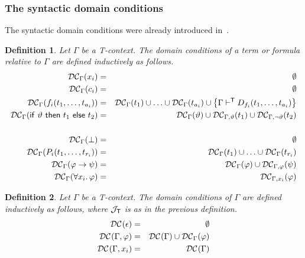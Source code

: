 \documentclass{article}
\newtheorem{definition}{Definition}[section]
\newcommand{\T}{\textsf T}
\newcommand{\ifthelse}[3]{\ensuremath{\mathsf{if}\ {#1}\ \mathsf{then}\ {#2}\ \mathsf{else}\ {#3}}}
\newcommand{\lang}[1]{\ensuremath{{\cal L}_{\mathsf{#1}}}}
\newcommand{\terms}[1]{\ensuremath{{\cal T}_{\mathsf{#1}}}}
\newcommand{\judg}[1]{\ensuremath{{\cal J}_{\mathsf{#1}}}}
\newcommand{\myvdash}[1]{\ensuremath{\vdash^{\mathsf{#1}}}}
\newcommand{\synDC}[1][{}]{\ifthenelse{\equal{#1}{}}{%
{\ensuremath{{\cal{DC}}}}}{%
{\ensuremath{{\cal{DC}}_{#1}}}}}
\def\sep{.\,}
\begin{document}
\subsubsection*{The syntactic domain conditions}

The syntactic domain conditions were already introduced
in~\cite{wie:zwa:03}.

\begin{definition}\label{defn:synDCGamma}
Let $\Gamma$ be a {\T}-context.  The domain conditions of a term or
formula relative to $\Gamma$ are defined inductively as follows.
\begin{eqnarray*}
\synDC[\Gamma](x_i) & = & \emptyset \\
\synDC[\Gamma](c_i) & = & \emptyset \\
\synDC[\Gamma](f_i(t_1,\ldots,t_{a_i})) & = &
 \synDC[\Gamma](t_1)\cup\ldots\cup\synDC[\Gamma](t_{a_i})
 \cup\left\{\Gamma\myvdash{T} D_{f_i}(t_1,\ldots,t_{a_i})\right\} \\
\synDC[\Gamma](\ifthelse{\vartheta}{t_1}{t_2}) & = &
 \synDC[\Gamma](\vartheta)\cup\synDC[\Gamma,\vartheta](t_1)
 \cup\synDC[\Gamma,\neg\vartheta](t_2)\\
\\
\synDC[\Gamma](\bot) & = & \emptyset \\
\synDC[\Gamma](P_i(t_1,\ldots,t_{r_i})) & = &
 \synDC[\Gamma](t_1)\cup\ldots\cup\synDC[\Gamma](t_{r_i}) \\
\synDC[\Gamma](\varphi\to\psi) & = &
 \synDC[\Gamma](\varphi)\cup\synDC[\Gamma,\varphi](\psi) \\
\synDC[\Gamma](\forall x_i\sep\varphi) & = & \synDC[\Gamma,x_i](\varphi)
\end{eqnarray*}
\end{definition}

\begin{definition}\label{defn:synDC}
Let $\Gamma$ be a {\T}-context.  The domain conditions of $\Gamma$ are defined
inductively as follows, where {\judg{T}} is as in the previous
definition.
\begin{eqnarray*}
\synDC(\epsilon) & = & \emptyset \\
\synDC(\Gamma,\varphi) & = & \synDC(\Gamma)\cup\synDC[\Gamma](\varphi) \\
\synDC(\Gamma,x_i) & = & \synDC(\Gamma)
\end{eqnarray*}
\end{definition}
\end{document}
